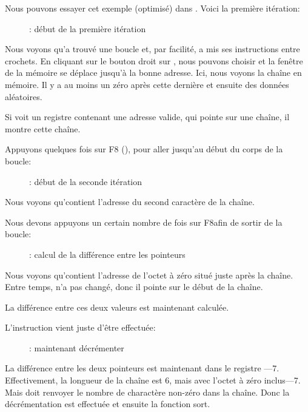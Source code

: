 ﻿\clearpage
{}
\myindex{\olly}

Nous pouvons essayer cet exemple (optimisé) dans \olly. Voici la première itération:

\begin{figure}[H]
\centering
{}
\caption{\olly: début de la première itération}
\label{fig:strlen_olly_1}
\end{figure}

Nous voyons qu'\olly a trouvé une boucle et, par facilité, a mis ses instructions
entre crochets.
En cliquant sur le bouton droit sur \EAX, nous pouvons choisir 
et la fenêtre de la mémoire se déplace jusqu'à la bonne adresse.
Ici, nous voyons la chaîne  en mémoire.
Il y a au moins un zéro après cette dernière et ensuite des données aléatoires.

Si \olly voit un registre contenant une adresse valide, qui pointe sur une chaîne,
il montre cette chaîne.

\clearpage
Appuyons quelques fois sur F8 (\stepover), pour aller jusqu'au début du corps de
la boucle:

\begin{figure}[H]
\centering
{}
\caption{\olly: début de la seconde itération}
\label{fig:strlen_olly_2}
\end{figure}

Nous voyons qu'\EAX contient l'adresse du second caractère de la chaîne.

\clearpage

Nous devons appuyons un certain nombre de fois sur F8afin de sortir de la boucle:

\begin{figure}[H]
\centering
{}
\caption{\olly: calcul de la différence entre les pointeurs}
\label{fig:strlen_olly_3}
\end{figure}

Nous voyons qu'\EAX contient l'adresse de l'octet à zéro situé juste après la chaîne.
Entre temps, \EDX n'a pas changé, donc il pointe sur le début de la chaîne.

La différence entre ces deux valeurs est maintenant calculée.

\clearpage
L'instruction \SUB vient juste d'être effectuée:

\begin{figure}[H]
\centering
{}
\caption{\olly: maintenant décrémenter \EAX}
\label{fig:strlen_olly_4}
\end{figure}

La différence entre les deux pointeurs est maintenant dans le registre \EAX---7.
Effectivement, la longueur de la chaîne  est 6, mais avec l'octet à zéro
inclus---7.
Mais  doit renvoyer le nombre de charactère non-zéro dans la chaîne.
Donc la décrémentation est effectuée et ensuite la fonction sort.
